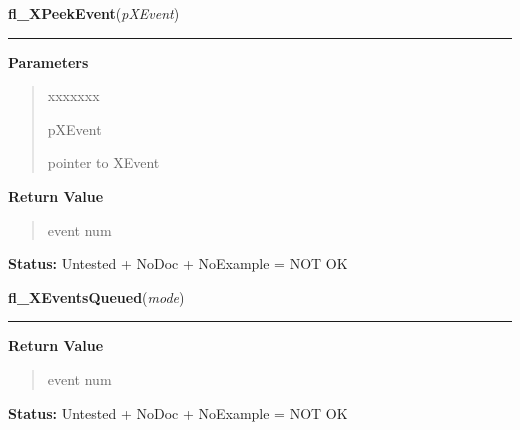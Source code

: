 \hspace{.8\funcindent}\begin{boxedminipage}{\funcwidth}

    \raggedright \textbf{fl\_XPeekEvent}(\textit{pXEvent})

    \vspace{-1.5ex}

    \rule{\textwidth}{0.5\fboxrule}
\setlength{\parskip}{2ex}
\setlength{\parskip}{1ex}
      \textbf{Parameters}
      \vspace{-1ex}

      \begin{quote}
        \begin{Ventry}{xxxxxxx}

          \item[pXEvent]

          pointer to XEvent

        \end{Ventry}

      \end{quote}

      \textbf{Return Value}
    \vspace{-1ex}

      \begin{quote}
      event num

      \end{quote}

\textbf{Status:} Untested + NoDoc + NoExample = NOT OK



    \end{boxedminipage}

    \label{xformslib:library:fl_XEventsQueued}

    \vspace{0.5ex}

\hspace{.8\funcindent}\begin{boxedminipage}{\funcwidth}

    \raggedright \textbf{fl\_XEventsQueued}(\textit{mode})

    \vspace{-1.5ex}

    \rule{\textwidth}{0.5\fboxrule}
\setlength{\parskip}{2ex}
\setlength{\parskip}{1ex}
      \textbf{Return Value}
    \vspace{-1ex}

      \begin{quote}
      event num

      \end{quote}

\textbf{Status:} Untested + NoDoc + NoExample = NOT OK



    \end{boxedminipage}

